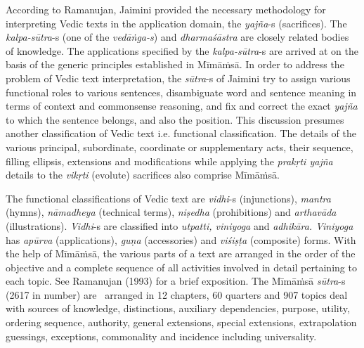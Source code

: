 According to Ramanujan, Jaimini provided the necessary methodology for interpreting Vedic texts in the application domain, the \textit{yajña}-s (sacrifices). The \textit{kalpa-sūtra}-s (one of the \textit{vedāṅga-s}) and \textit{dharmaśāstra} are closely related bodies of knowledge. The applications specified by the \textit{kalpa-sūtra}-s are arrived at on the basis of the generic principles established in Mīmāṁsā. In order to address the problem of Vedic text interpretation, the \textit{sūtra}-s of Jaimini try to assign various functional roles to various sentences, disambiguate word and sentence meaning in terms of context and commonsense reasoning, and fix and correct the exact \textit{yajña} to which the sentence belongs, and also the position. This discussion presumes another classification of Vedic text i.e. functional classification. The details of the various principal, subordinate, coordinate or supplementary acts, their sequence, filling ellipsis, extensions and modifications while applying the \textit{prakṛti yajña} details to the \textit{vikṛti} (evolute) sacrifices also comprise Mīmāṁsā.

\vskip 3pt

The functional classifications of Vedic text are \textit{vidhi}-s (injunctions), \textit{mantra} (hymns), \textit{nāmadheya} (technical terms), \textit{niṣedha} (prohibitions) and \textit{arthavāda} (illustrations). \textit{Vidhi}-s are classified into \textit{utpatti, viniyoga} and \textit{adhikāra. Viniyoga} has \textit{apūrva} (applications), \textit{guṇa} (accessories) and \textit{viśiṣṭa} (composite) forms. With the help of Mīmāṁsā, the various parts of a text are arranged in the order of the objective and a complete sequence of all activities involved in detail pertaining to each topic. See Ramanujan (1993) for a brief exposition. The Mīmāṁsā \textit{sūtra}-s (2617 in number) are  arranged in 12 chapters, 60 quarters and 907 topics deal with sources of knowledge, distinctions, auxiliary dependencies, purpose, utility, ordering sequence, authority, general extensions, special extensions, extrapolation guessings, exceptions, commonality and incidence including universality.

